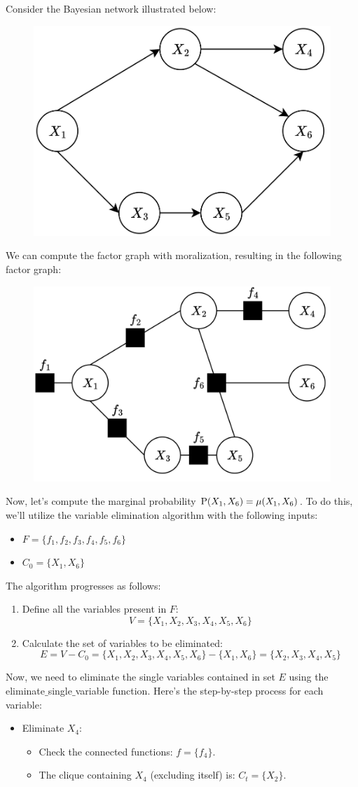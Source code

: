 \begin{example}
    Consider the Bayesian network illustrated below:
    \begin{figure}[H]
        \centering
        \includegraphics[width=0.25\linewidth]{images/bn.png}
    \end{figure}
    We can compute the factor graph with moralization, resulting in the following factor graph:
    \begin{figure}[H]
        \centering
        \includegraphics[width=0.25\linewidth]{images/bnf1.png}
    \end{figure}
    Now, let's compute the marginal probability $\textnormal{P}(X_1,X_6)=\mu(X_1,X_6)$. To do this, we'll utilize the variable elimination algorithm with the following inputs:
    \begin{itemize}
        \item $F=\{f_1,f_2,f_3,f_4,f_5,f_6\}$
        \item $C_0=\{X_1,X_6\}$
    \end{itemize}
    The algorithm progresses as follows:
    \begin{enumerate}
        \item Define all the variables present in $F$: 
            \[V=\{X_1,X_2,X_3,X_4,X_5,X_6\}\]
        \item Calculate the set of variables to be eliminated:
            \[E=V-C_0=\{X_1,X_2,X_3,X_4,X_5,X_6\}-\{X_1,X_6\}=\{X_2,X_3,X_4,X_5\}\]
    \end{enumerate}
    Now, we need to eliminate the single variables contained in set $E$ using the  eliminate$\_$single$\_$variable function. Here's the step-by-step process for each variable:
    \begin{itemize}
        \item Eliminate $X_4$: 
            \begin{itemize}
                \item Check the connected functions: $f=\{f_4\}$. 
                \item The clique containing $X_4$ (excluding itself) is: $C_t=\{X_2\}$. 

\end{itemize}
\end{itemize}
\end{example}
